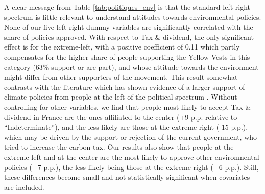 \documentclass[english,5p,authoryear]{elsarticle}
\begin{document}
A clear message from Table \ref{tab:politiques_env} is that the standard left-right spectrum is little relevant to understand attitudes towards environmental policies. None of our five left-right dummy variables are significantly correlated with the share of policies approved. With respect to Tax \& dividend, the only significant effect is for the extreme-left, with a positive coefficient of 0.11 which partly compensates for the higher share of people supporting the Yellow Vests in this category (63\% support or are part), and whose attitude towards the environment might differ from other supporters of the movement. This result somewhat contrasts with the literature which has shown evidence of a larger support of climate policies from people at the left of the political spectrum \citep[see][for a review]{drews_van_der_bergh_2016}. Without controlling for other variables, we find that people most likely to accept Tax \& dividend in France are the ones affiliated to the center (+9 p.p. relative to ``Indeterminate''), and the less likely are those at the extreme-right (-15 p.p.), which may be driven by the support or rejection of the current government, who tried to increase the carbon tax. Our results also show that people at the extreme-left and at the center are the most likely to approve other environmental policies (+7 p.p.), the less likely being those at the extreme-right ($-$6 p.p.). Still, these differences become small and not statistically significant when covariates are included.

\end{document}
